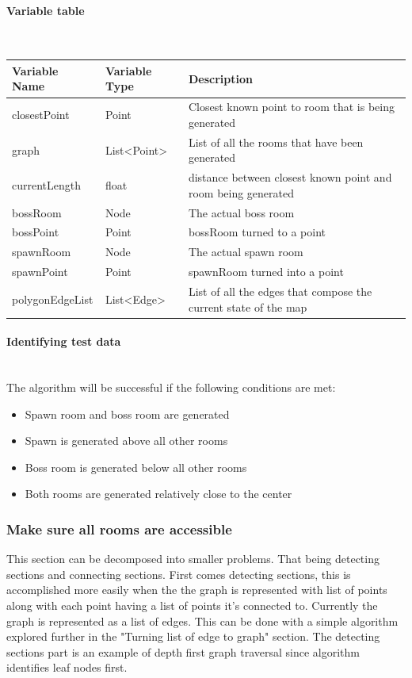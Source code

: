 \documentclass{article}
\newcommand{\myparagraph}[1]{\paragraph{#1}\mbox{}\\} %
\newcommand{\smallBr}{\vspace{1.5mm}}
\begin{document}
\myparagraph{Variable table}
\smallBr
\begin{tabular}{l|l|l}
Variable Name   & Variable Type                      & Description                                                     \\ \hline
closestPoint    & Point                              & Closest known point to room that is being generated             \\
graph           & List\textless{}Point\textgreater{} & List of all the rooms that have been generated                  \\
currentLength   & float                              & distance between closest known point and room being generated   \\
bossRoom        & Node                               & The actual boss room                                            \\
bossPoint       & Point                              & bossRoom turned to a point                                      \\
spawnRoom       & Node                               & The actual spawn room                                           \\
spawnPoint      & Point                              & spawnRoom turned into a point                                   \\
polygonEdgeList & List\textless{}Edge\textgreater{}  & List of all the edges that compose the current state of the map
\end{tabular}

\myparagraph{Identifying test data}
The algorithm will be successful if the following conditions are met:
\begin{itemize}
\item{Spawn room and boss room are generated}
\item{Spawn is generated above all other rooms}
\item{Boss room is generated below all other rooms}
\item{Both rooms are generated relatively close to the center}
\end{itemize}

\subsubsection{Make sure all rooms are accessible}
This section can be decomposed into smaller problems. That being detecting sections and connecting sections. First comes detecting sections, this is accomplished more easily when the the graph is represented with list of points along with each point having a list of points it's connected to. Currently the graph is represented as a list of edges. This can be done with a simple algorithm explored further in the "Turning list of edge to graph" section. The detecting sections part is an example of depth first graph traversal since algorithm identifies leaf nodes first.
\end{document}
